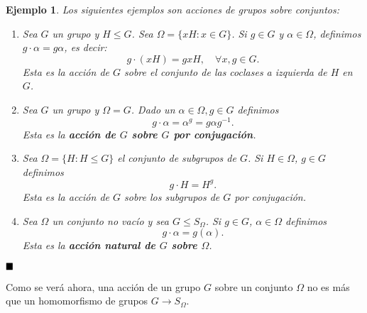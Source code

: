 \documentclass[12pt]{article}
\newtheorem{example}{Ejemplo}[theorem]
\begin{document}
\begin{example}Los siguientes ejemplos son acciones de grupos sobre conjuntos:
\begin{enumerate}
\item Sea $G$ un grupo y $H \leq G$. Sea $\Omega = \lbrace xH : x \in G \rbrace$. Si $g \in G$ y $\alpha \in \Omega$, definimos $g \cdot \alpha = g\alpha$, es decir: $$g \cdot(xH) = gxH, \quad \forall x,g \in G.$$ Esta es la acción de $G$ sobre el conjunto de las coclases a izquierda de $H$ en $G$.
\item Sea $G$ un grupo y $\Omega = G$. Dado un $\alpha \in \Omega, g \in G$ definimos $$g \cdot \alpha= \alpha^g=g\alpha g^{-1}.$$ Esta es la \textbf{acción de $G$ sobre $G$ por conjugación}.
\item Sea $\Omega = \lbrace H : H \leq G \rbrace$ el conjunto de subgrupos de $G$. Si $H \in \Omega$, $g \in G$ definimos $$ g \cdot H = H ^g.$$ Esta es la acción de $G$ sobre los subgrupos de $G$ por conjugación.
\item Sea $\Omega$ un conjunto no vacío y sea $G \leq S_{\Omega}$. Si $g \in G$, $\alpha \in \Omega$ definimos $$g \cdot \alpha = g(\alpha).$$ Esta es la \textbf{acción natural de $G$ sobre $\Omega$}.
\end{enumerate}
\end{example}
$\hfill \blacksquare$

Como se verá ahora, una acción de un grupo $G$ sobre un conjunto $\Omega$ no es más que un homomorfismo de grupos $G \longrightarrow S_{\Omega}$.
\end{document}
